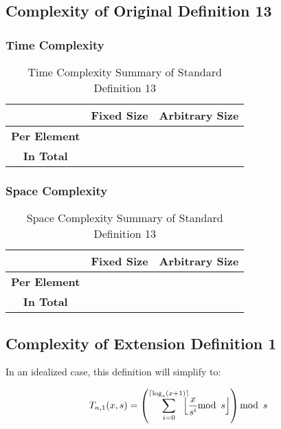 \documentclass[conference]{IEEEtran}
\begin{document}
\subsection{Complexity of Original Definition 13}
\label{ca:p2_d13}

\subsubsection{Time Complexity}

\begin{table}[H]
    \centering
    \caption{Time Complexity Summary of Standard Definition 13}
    \begin{tabular}{|c|c|c|}
        \hline
        & \textbf{Fixed Size} & \textbf{Arbitrary Size} \\
        \hline
        \textbf{Per Element} &  &  \\
        \hline
        \textbf{In Total} &  &  \\
        \hline
    \end{tabular}
    \label{tab:time_p2_d13}
\end{table}

\subsubsection{Space Complexity}

\begin{table}[H]
    \centering
    \caption{Space Complexity Summary of Standard Definition 13}
    \begin{tabular}{|c|c|c|}
        \hline
        & \textbf{Fixed Size} & \textbf{Arbitrary Size} \\
        \hline
        \textbf{Per Element} &  &  \\
        \hline
        \textbf{In Total} &  &  \\
        \hline
    \end{tabular}
    \label{tab:space_p2_d13}
\end{table}

\subsection{Complexity of Extension Definition 1}
\label{ca:pn_d01}

In an idealized case, this definition will simplify to:

\begin{equation}
T_{n,1}(x, s) = \left(\sum_{i=0}^{\ceil{\log_s(x + 1)}} \hspace{-8pt} \floor{\dfrac{x}{s^i} \mod{s}} \right) \mod{s}
\end{equation}
\end{document}
